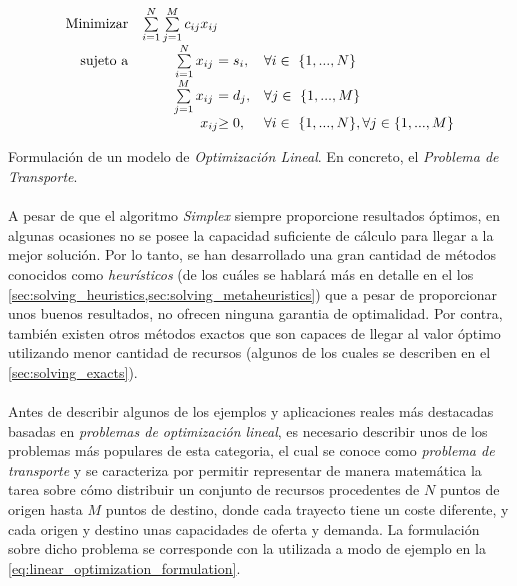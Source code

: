 \documentclass{subfiles}
\begin{document}
        \begin{eqfloat}
          \begin{equation}
            \begin{array}{rr@{}ll}
              \text{Minimizar} & \sum\limits_{i = 1}^{N}\sum\limits_{j = 1}^{M}  c_{ij}x_{ij} &                 & \\
              \text{sujeto a}	 & \sum\limits_{i = 1}^{N} x_{ij} \ &= s_{i}, & \forall i \in \{1,...,N\} \\
                               & \sum\limits_{j = 1}^{M} x_{ij} \ &= d_{j}, & \forall j \in \{1,...,M\} \\
                               &                               	x_{ij} 	&\geq 0, 	                 & \forall i \in \{1,...,N\},\forall j \in \{1,...,M\}
            \end{array}
          \end{equation}
          \caption{Formulación de un modelo de \emph{Optimización Lineal}. En concreto, el \emph{Problema de Transporte}.}
          \label{eq:linear_optimization_formulation}
        \end{eqfloat}

        \paragraph{}
        A pesar de que el algoritmo \emph{Simplex} siempre proporcione resultados óptimos, en algunas ocasiones no se posee la capacidad suficiente de cálculo para llegar a la mejor solución. Por lo tanto, se han desarrollado una gran cantidad de métodos conocidos como \emph{heurísticos} (de los cuáles se hablará más en detalle en el los \cref{sec:solving_heuristics,sec:solving_metaheuristics}) que a pesar de proporcionar unos buenos resultados, no ofrecen ninguna garantia de optimalidad. Por contra, también existen otros métodos exactos que son capaces de llegar al valor óptimo utilizando menor cantidad de recursos (algunos de los cuales se describen en el \cref{sec:solving_exacts}).

        \paragraph{}
        Antes de describir algunos de los ejemplos y aplicaciones reales más destacadas basadas en \emph{problemas de optimización lineal}, es necesario describir unos de los problemas más populares de esta categoria, el cual se conoce como \emph{problema de transporte} y se caracteriza por permitir representar de manera matemática la tarea sobre cómo distribuir un conjunto de recursos procedentes de $N$ puntos de origen hasta $M$ puntos de destino, donde cada trayecto tiene un coste diferente, y cada origen y destino unas capacidades de oferta y demanda. La formulación sobre dicho problema se corresponde con la utilizada a modo de ejemplo en la \cref{eq:linear_optimization_formulation}.
\end{document}
